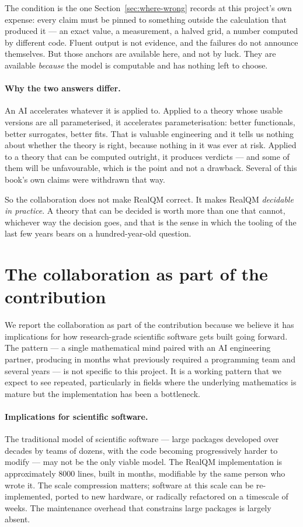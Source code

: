 The condition is the one Section~\ref{sec:where-wrong} records at this project's own expense: every
claim must be pinned to something outside the calculation that produced it --- an exact value, a
measurement, a halved grid, a number computed by different code. Fluent output is not evidence, and
the failures do not announce themselves. But those anchors are available here, and not by luck. They
are available \emph{because} the model is computable and has nothing left to choose.

\paragraph{Why the two answers differ.} An AI accelerates whatever it is applied to. Applied to a
theory whose usable versions are all parameterised, it accelerates parameterisation: better
functionals, better surrogates, better fits. That is valuable engineering and it tells us nothing
about whether the theory is right, because nothing in it was ever at risk. Applied to a theory that
can be computed outright, it produces verdicts --- and some of them will be unfavourable, which is
the point and not a drawback. Several of this book's own claims were withdrawn that way.

So the collaboration does not make RealQM correct. It makes RealQM \emph{decidable in practice}. A
theory that can be decided is worth more than one that cannot, whichever way the decision goes, and
that is the sense in which the tooling of the last few years bears on a hundred-year-old question.

\section{The collaboration as part of the contribution}\label{sec:collab-contribution}

We report the collaboration as part of the contribution because we believe it has implications for how research-grade scientific software gets built going forward. The pattern --- a single mathematical mind paired with an AI engineering partner, producing in months what previously required a programming team and several years --- is not specific to this project. It is a working pattern that we expect to see repeated, particularly in fields where the underlying mathematics is mature but the implementation has been a bottleneck.

\paragraph{Implications for scientific software.}
The traditional model of scientific software --- large packages developed over decades by teams of dozens, with the code becoming progressively harder to modify --- may not be the only viable model. The RealQM implementation is approximately 8000 lines, built in months, modifiable by the same person who wrote it. The scale compression matters; software at this scale can be re-implemented, ported to new hardware, or radically refactored on a timescale of weeks. The maintenance overhead that constrains large packages is largely absent.

